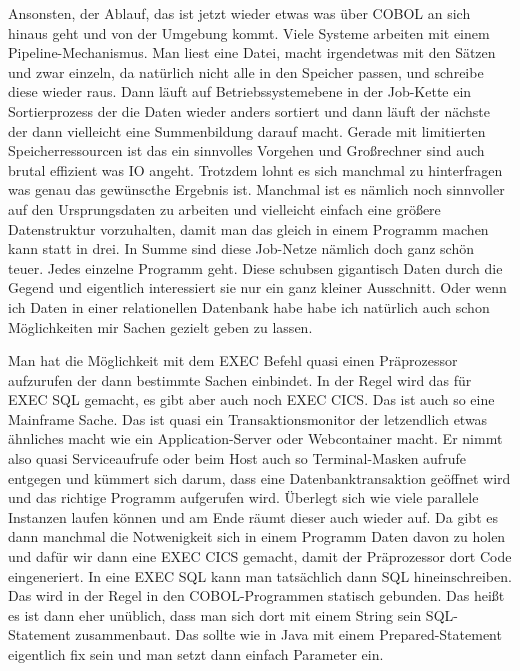 {Ansonsten, der Ablauf, das ist jetzt wieder etwas was über COBOL an sich hinaus geht und von der Umgebung kommt. Viele Systeme arbeiten mit einem Pipeline-Mechanismus. Man liest eine Datei, macht irgendetwas mit den Sätzen und zwar einzeln, da natürlich nicht alle in den Speicher passen, und schreibe diese wieder raus. Dann läuft \zB auf Betriebssystemebene in der Job-Kette ein Sortierprozess der die Daten wieder anders sortiert und dann läuft der nächste der dann vielleicht eine Summenbildung darauf macht. Gerade mit limitierten Speicherressourcen ist das ein sinnvolles Vorgehen und Großrechner sind auch brutal effizient was IO angeht. Trotzdem lohnt es sich manchmal zu hinterfragen was genau das gewünscthe Ergebnis ist. Manchmal ist es nämlich noch sinnvoller auf den Ursprungsdaten zu arbeiten und vielleicht einfach eine größere Datenstruktur vorzuhalten, damit man das gleich in einem Programm machen kann statt in drei. In Summe sind diese Job-Netze nämlich doch ganz schön teuer. Jedes einzelne Programm geht. Diese schubsen gigantisch Daten durch die Gegend und eigentlich interessiert sie nur ein ganz kleiner Ausschnitt. Oder wenn ich Daten in einer relationellen Datenbank habe habe ich natürlich auch schon Möglichkeiten mir Sachen gezielt geben zu lassen.

Man hat die Möglichkeit mit dem EXEC Befehl quasi einen Präprozessor aufzurufen der dann bestimmte Sachen einbindet. In der Regel wird das für EXEC SQL gemacht, es gibt aber auch noch EXEC CICS. Das ist auch so eine Mainframe Sache. Das ist quasi ein Transaktionsmonitor der letzendlich etwas ähnliches macht wie ein Application-Server oder Webcontainer macht. Er nimmt also quasi Serviceaufrufe oder beim Host auch so Terminal-Masken aufrufe entgegen und kümmert sich darum, dass eine Datenbanktransaktion geöffnet wird und das richtige Programm aufgerufen wird. Überlegt sich wie viele parallele Instanzen laufen können und am Ende räumt dieser auch wieder auf. Da gibt es dann manchmal die Notwenigkeit sich in einem Programm Daten davon zu holen und dafür wir dann eine EXEC CICS gemacht, damit der Präprozessor dort Code eingeneriert. In eine EXEC SQL kann man tatsächlich dann SQL hineinschreiben. Das wird in der Regel in den COBOL-Programmen statisch gebunden. Das heißt es ist dann eher unüblich, dass man sich dort mit einem String sein SQL-Statement zusammenbaut. Das sollte wie in Java mit einem Prepared-Statement eigentlich fix sein und man setzt dann einfach Parameter ein.

}
